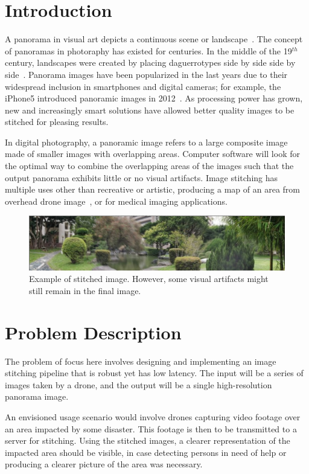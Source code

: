 \documentclass[12pt, a4paper]{article}
\begin{document}
\section{Introduction}
\label{sec:Introduction}
A panorama in visual art depicts a continuous scene or landscape~\cite{Panorama}. 
The concept of panoramas in photoraphy has existed for centuries. 
In the middle of the 19$^{th}$ century, landscapes were created by placing daguerrotypes side by side
side by side~\cite{OhioStitching}. Panorama images have been popularized in the last
years due to their widespread inclusion in smartphones and digital cameras; for example,
the iPhone5 introduced panoramic images in 2012~\cite{iPhoneStitch}. As processing
power has grown, new and increasingly smart solutions have allowed better quality
images to be stitched for pleasing results.

In digital photography, a panoramic image refers to a large composite image made of 
smaller images with overlapping areas. 
Computer software will look for the optimal way to combine the overlapping areas of the 
images such that the output panorama exhibits little or no visual artifacts. 
Image stitching has multiple uses other than recreative or artistic, producing
a map of an area from overhead drone image~\cite{OpenDroneMapTheMissingGuide}, or 
for medical imaging applications.


\begin{figure}[b]
		\label{fig:PanoExample}
		\centering
		\includegraphics[scale=0.4]{pano.png}
		\caption{Example of stitched image. However, some visual artifacts might 
		still remain in the final image.}	
\end{figure}

\section{Problem Description}
\label{sec:ProblemDescription}
The problem of focus here involves designing and implementing an image stitching 
pipeline that is robust yet has low latency. The input will be a series of images
taken by a drone, and the output will be a single high-resolution panorama image.

An envisioned usage scenario would involve drones capturing video footage 
over an area impacted by some disaster. This footage is then to be transmitted 
to a server for stitching. Using the stitched images, a clearer representation of the 
impacted area should be visible, in case detecting persons in need of help or
producing a clearer picture of the area was necessary. 
\end{document}
